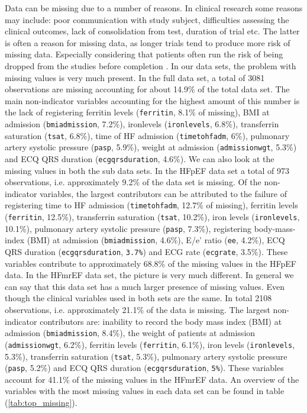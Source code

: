 \documentclass[../thesis.tex]{subfiles}
\begin{document}
\noindent Data can be missing due to a number of reasons. In clinical research some reasons may include: poor communication with study subject, difficulties assessing the clinical outcomes, lack of consolidation from test, duration of trial etc. The latter is often a reason for missing data, as longer trials tend to produce more risk of missing data. Especially considering that patients often run the risk of being dropped from the studies before completion \citep{myers2000handling}. In our data sets, the problem with missing values is very much present. In the full data set, a total of 3081 observations are missing accounting for about 14.9\% of the total data set. The main non-indicator variables accounting for the highest amount of this number is the lack of registering ferritin levels (\texttt{ferritin}, 8.1\% of missing), BMI at admission (\texttt{bmiadmission}, 7.2\%), ironlevels (\texttt{ironlevels}, 6.8\%), transferrin saturation (\texttt{tsat}, 6.8\%), time of HF admission (\texttt{timetohfadm}, 6\%), pulmonary artery systolic pressure (\texttt{pasp}, 5.9\%), weight at admission (\texttt{admissionwgt}, 5.3\%) and ECQ QRS duration (\texttt{ecgqrsduration}, 4.6\%). We can also look at the missing values in both the sub data sets. In the HFpEF data set a total of 973 observations, i.e. approximately 9.2\% of the data set is missing. Of the non-indicator variables, the largest contributors can be attributed to the failure of registering time to HF admission (\texttt{timetohfadm}, 12.7\% of missing), ferritin levels (\texttt{ferritin}, 12.5\%), transferrin saturation (\texttt{tsat}, 10.2\%), iron levels (\texttt{ironlevels}, 10.1\%), pulmonary artery systolic pressure (\texttt{pasp}, 7.3\%), registering body-mass-index (BMI) at admission (\texttt{bmiadmission}, 4.6\%), E/e' ratio (\texttt{ee}, 4.2\%), ECQ QRS duration (\texttt{ecgqrsduration}, \texttt{3.7\%}) and ECG rate (\texttt{ecgrate}, 3.5\%). These variables contribute to approximately 68.8\% of the missing values in the HFpEF data. In the HFmrEF data set, the picture is very much different. In general we can say that this data set has a much larger presence of missing values. Even though the clinical variables used in both sets are the same. In total 2108 observations, i.e. approximately 21.1\% of the data is missing. The largest non-indicator contributors are: inability to record the body mass index (BMI) at admission (\texttt{bmiadmission}, 8.4\%), the weight of patients at admission (\texttt{admissionwgt}, 6.2\%), ferritin levels (\texttt{ferritin}, 6.1\%), iron levels (\texttt{ironlevels}, 5.3\%), transferrin saturation (\texttt{tsat}, 5.3\%), pulmonary artery systolic pressure (\texttt{pasp}, 5.2\%) and ECQ QRS duration (\texttt{ecgqrsduration}, \texttt{5\%}). These variables account for 41.1\% of the missing values in the HFmrEF data. An overview of the variables with the most missing values in each data set can be found in table (\ref{tab:top_missing}).
\end{document}
